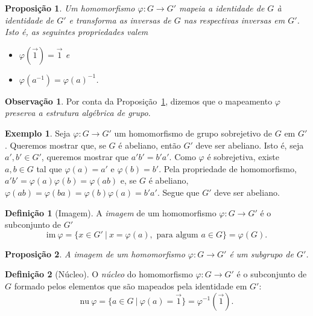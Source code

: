 \documentclass[a4paper,12pt]{report}
\theoremstyle{plain}
\newtheorem{proposicao}{Proposição}[section]
\theoremstyle{definition}
\newtheorem{definicao}{Definição}[section]
\newtheorem{observacao}{Observação}[section]
\newtheorem{exemplo}{Exemplo}[section]
\begin{document}
\begin{proposicao}\label{prop:homo}
	 Um homomorfismo \(\varphi: G\longrightarrow G'\) mapeia a identidade de $G$ à identidade de $G'$ e transforma as inversas de $G$ nas respectivas inversas em $G'$. Isto é, as seguintes propriedades valem
	 \begin{itemize}
	 	\item \(\varphi(\vec{1}) = \vec{1}\) e 
	 	\item \(\varphi(a^{-1}) = \varphi(a)^{-1}\).	
 	 \end{itemize}
	  
\end{proposicao}

\begin{observacao}
	Por conta da Proposição~\ref{prop:homo}, dizemos que o mapeamento $\varphi$ \emph{preserva a estrutura algébrica de grupo}.
\end{observacao}

\begin{exemplo}
	Seja $\varphi: G \longrightarrow G'$ um homomorfismo de grupo sobrejetivo de $G$ em $G'$. Queremos mostrar que, se $G$ é abeliano, então $G'$ deve ser abeliano. Isto é, seja $a',b'\in G'$, queremos mostrar que $a'b' = b'a'$. Como $\varphi$ é sobrejetiva, existe $a,b\in G$ tal que $\varphi(a) = a'$ e $\varphi(b) = b'$. Pela propriedade de homomorfismo, $a'b' = \varphi(a)\varphi(b) = \varphi(ab)$ e, se $G$ é abeliano, $\varphi(ab) = \varphi(ba) = \varphi(b)\varphi(a) = b'a'$. Segue que $G'$ deve ser abeliano.
\end{exemplo}

\begin{definicao}[Imagem]
	A \emph{imagem} de um homomorfismo
	\(\varphi: G\longrightarrow G'\) é o subconjunto de \(G'\)	\[\text{im}\ \varphi = \{x\in G' \ |\ x = \varphi(a), \text{ para algum } a\in G\} = \varphi(G).\]
\end{definicao}

\begin{proposicao}
	A imagem de um homomorfismo $\varphi: G \longrightarrow G'$ é um subgrupo de $G'$.
\end{proposicao}

\begin{definicao}[Núcleo]
	O \emph{núcleo} do homomorfismo $\varphi: G \longrightarrow G'$ é o subconjunto de
	\(G\) formado pelos elementos que são mapeados pela identidade em
	\(G'\):	\[\text{nu} \ \varphi = \{a \in G \ | \ \varphi(a) = \vec{1}\} = \varphi^{-1}(\vec{1}).\]
\end{definicao}
\end{document}
